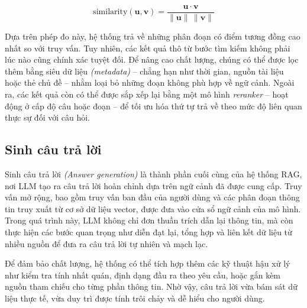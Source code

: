\[
    \mathrm{similarity}(\mathbf{u},\mathbf{v})
    = \frac{\mathbf{u}\cdot\mathbf{v}}{\lVert \mathbf{u} \rVert \, \lVert \mathbf{v} \rVert}
\]

Dựa trên phép đo này, hệ thống trả về những phân đoạn có điểm tương đồng cao nhất so với truy vấn. Tuy nhiên, các kết quả thô từ bước tìm kiếm không phải lúc nào cũng chính xác tuyệt đối. Để nâng cao chất lượng, chúng có thể được lọc thêm bằng siêu dữ liệu \emph{(metadata)} -- chẳng hạn như thời gian, nguồn tài liệu hoặc thẻ chủ đề -- nhằm loại bỏ những đoạn không phù hợp về ngữ cảnh. Ngoài ra, các kết quả còn có thể được sắp xếp lại bằng một mô hình \emph{reranker} -- hoạt động ở cấp độ câu hoặc đoạn -- để tối ưu hóa thứ tự trả về theo mức độ liên quan thực sự đối với câu hỏi.

\subsection{Sinh câu trả lời}

{Sinh câu trả lời} \emph{(Answer generation)} là thành phần cuối cùng của hệ thống RAG, nơi LLM tạo ra câu trả lời hoàn chỉnh dựa trên ngữ cảnh đã được cung cấp. Truy vấn mở rộng, bao gồm truy vấn ban đầu của người dùng và các phân đoạn thông tin truy xuất từ cơ sở dữ liệu vector, được đưa vào cửa sổ ngữ cảnh của mô hình. Trong quá trình này, LLM không chỉ đơn thuần trích dẫn lại thông tin, mà còn thực hiện các bước quan trọng như diễn đạt lại, tổng hợp và liên kết dữ liệu từ nhiều nguồn để đưa ra câu trả lời tự nhiên và mạch lạc.

Để đảm bảo chất lượng, hệ thống có thể tích hợp thêm các kỹ thuật hậu xử lý như kiểm tra tính nhất quán, định dạng đầu ra theo yêu cầu, hoặc gắn kèm nguồn tham chiếu cho từng phần thông tin. Nhờ vậy, câu trả lời vừa bám sát dữ liệu thực tế, vừa duy trì được tính trôi chảy và dễ hiểu cho người dùng.


















